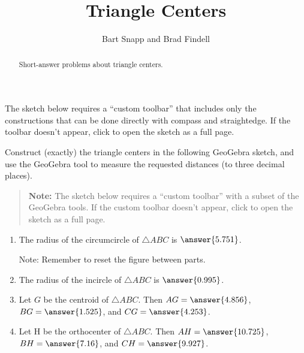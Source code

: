 \documentclass[nooutcomes]{ximera}
\title{Triangle Centers}
\author{Bart Snapp and Brad Findell}
\begin{document}
\begin{abstract}
Short-answer problems about triangle centers. 
\end{abstract}
\maketitle


\begin{warning}
The sketch below requires a ``custom toolbar'' that includes only the constructions that can be done directly with compass and straightedge.  If the toolbar doesn't appear, click 
 to open the sketch as a full page.
\end{warning}

\begin{problem}
Construct (exactly) the triangle centers in the following 
GeoGebra sketch, and use the GeoGebra tool to measure the requested distances (to three decimal places). 
\begin{quote}
\textbf{Note:} The sketch below requires a ``custom toolbar'' with a subset of the GeoGebra tools.  If the custom toolbar doesn't appear, click 
 to open the sketch as a full page.  
\end{quote}
\begin{center}  
\end{center}
%
\begin{enumerate}
\item The radius of the circumcircle of $\triangle ABC$ is 
$\answer{5.751}$.  

Note: Remember to reset the figure between parts.   

\item The radius of the incircle of $\triangle ABC$ is 
$\answer{0.995}$.  

\item Let $G$ be the centroid of $\triangle ABC$.  
Then $AG = \answer{4.856}$, $BG = \answer{1.525}$, 
and $CG = \answer{4.253}$.  

\item Let H be the orthocenter of $\triangle ABC$. 
Then $AH = \answer{10.725}$, $BH = \answer{7.16}$, 
and $CH = \answer{9.927}$. 
\end{enumerate}

\end{problem}
\end{document}
